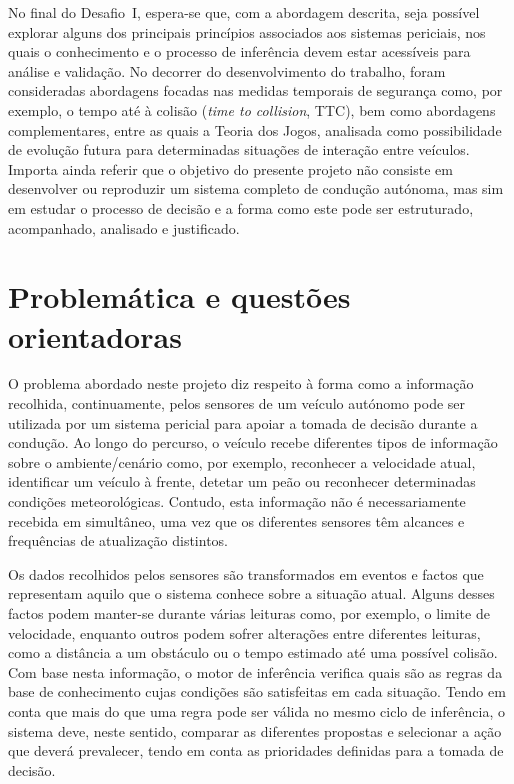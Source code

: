 No final do Desafio~I, espera-se que, com a abordagem descrita, seja possível
explorar alguns dos principais princípios associados aos sistemas periciais,
nos quais o conhecimento e o processo de inferência devem estar acessíveis
para análise e validação. No decorrer do desenvolvimento do trabalho, foram
consideradas abordagens focadas nas medidas temporais de segurança como, por
exemplo, o tempo até à colisão (\emph{time to collision}, TTC), bem como abordagens complementares,
entre as quais a Teoria dos Jogos, analisada como possibilidade de evolução
futura para determinadas situações de interação entre veículos. Importa ainda
referir que o objetivo do presente projeto não consiste em desenvolver ou
reproduzir um sistema completo de condução autónoma, mas sim em estudar o
processo de decisão e a forma como este pode ser estruturado, acompanhado,
analisado e justificado.

\section{Problemática e questões orientadoras}
\label{sec:problematica}

O problema abordado neste projeto diz respeito à forma como a informação
recolhida, continuamente, pelos sensores de um veículo autónomo pode ser
utilizada por um sistema pericial para apoiar a tomada de decisão durante a
condução. Ao longo do percurso, o veículo recebe diferentes tipos de
informação sobre o ambiente/cenário como, por exemplo, reconhecer a
velocidade atual, identificar um veículo à frente, detetar um peão ou
reconhecer determinadas condições meteorológicas. Contudo, esta informação
não é necessariamente recebida em simultâneo, uma vez que os diferentes
sensores têm alcances e frequências de atualização distintos.

Os dados recolhidos pelos sensores são transformados em eventos e factos que
representam aquilo que o sistema conhece sobre a situação atual. Alguns
desses factos podem manter-se durante várias leituras como, por exemplo, o
limite de velocidade, enquanto outros podem sofrer alterações entre
diferentes leituras, como a distância a um obstáculo ou o tempo estimado até
uma possível colisão. Com base nesta informação, o motor de inferência
verifica quais são as regras da base de conhecimento cujas condições são
satisfeitas em cada situação. Tendo em conta que mais do que uma regra pode
ser válida no mesmo ciclo de inferência, o sistema deve, neste sentido,
comparar as diferentes propostas e selecionar a ação que deverá prevalecer,
tendo em conta as prioridades definidas para a tomada de decisão.

